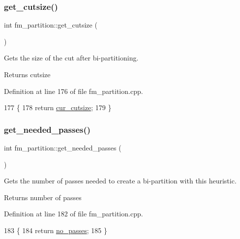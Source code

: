 \subsubsection{\texorpdfstring{get\+\_\+cutsize()}{get\_cutsize()}}
{\footnotesize\ttfamily int fm\+\_\+partition\+::get\+\_\+cutsize (\begin{DoxyParamCaption}{ }\end{DoxyParamCaption})}

Gets the size of the cut after bi-\/partitioning.

\begin{DoxyReturn}{Returns}
cutsize 
\end{DoxyReturn}


Definition at line 176 of file fm\+\_\+partition.\+cpp.


\begin{DoxyCode}
177 \{
178     \textcolor{keywordflow}{return} \mbox{\hyperlink{classfm__partition_abc8f24c354d2a15f8ec8ef9a46252c93}{cur\_cutsize}};
179 \}
\end{DoxyCode}
\mbox{\label{classfm__partition_aa8aa84286a6939d17175fbf646ba3176}} 
\subsubsection{\texorpdfstring{get\+\_\+needed\+\_\+passes()}{get\_needed\_passes()}}
{\footnotesize\ttfamily int fm\+\_\+partition\+::get\+\_\+needed\+\_\+passes (\begin{DoxyParamCaption}{ }\end{DoxyParamCaption})}

Gets the number of passes needed to create a bi-\/partition with this heuristic.

\begin{DoxyReturn}{Returns}
number of passes 
\end{DoxyReturn}


Definition at line 182 of file fm\+\_\+partition.\+cpp.


\begin{DoxyCode}
183 \{
184     \textcolor{keywordflow}{return} \mbox{\hyperlink{classfm__partition_af35277f499ad76a979ee33b0cd388dc5}{no\_passes}};
185 \}
\end{DoxyCode}
\mbox{\label{classfm__partition_af5f6ad817fe30760f3bc5470bd70c4c9}} 

